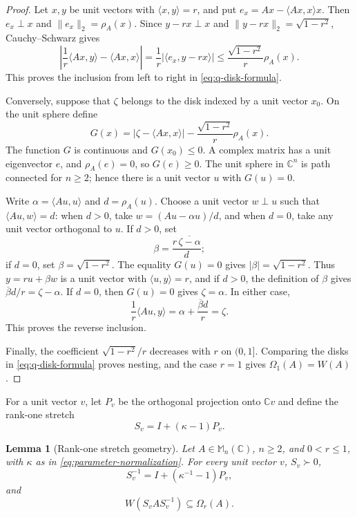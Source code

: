 \documentclass[preprints,article,submit,oneauthor]{Definitions/mdpi}
\newcounter{manuscriptresult}[section]
\theoremstyle{mdpi}
\newtheorem{lemma}[manuscriptresult]{Lemma}
\theoremstyle{definition}
\newcommand{\C}{\mathbb C}
\newcommand{\Mn}{\mathbb M_n(\C)}
\begin{document}
\begin{proof}
Let $x,y$ be unit vectors with $\langle x,y\rangle=r$, and put
$e_x=Ax-\langle Ax,x\rangle x$.  Then $e_x\perp x$ and
$\lVert e_x\rVert_2=\rho_A(x)$.  Since
$y-rx\perp x$ and $\lVert y-rx\rVert_2=\sqrt{1-r^2}$,
Cauchy--Schwarz gives
\[
 \left\lvert
  \frac1r\langle Ax,y\rangle-\langle Ax,x\rangle
 \right\rvert
 =\frac1r\lvert\langle e_x,y-rx\rangle\rvert
 \leq\frac{\sqrt{1-r^2}}r\rho_A(x).
\]
This proves the inclusion from left to right in
\eqref{eq:q-disk-formula}.

Conversely, suppose that $\zeta$ belongs to the disk indexed by a unit
vector $x_0$.  On the unit sphere define
\[
 G(x)=\lvert\zeta-\langle Ax,x\rangle\rvert
      -\frac{\sqrt{1-r^2}}r\rho_A(x).
\]
The function $G$ is continuous and $G(x_0)\leq0$.  A complex matrix has
a unit eigenvector $e$, and $\rho_A(e)=0$, so $G(e)\geq0$.  The unit
sphere in $\C^n$ is path connected for $n\geq2$; hence there is a unit
vector $u$ with $G(u)=0$.

Write $\alpha=\langle Au,u\rangle$ and $d=\rho_A(u)$.  Choose a unit
vector $w\perp u$ such that $\langle Au,w\rangle=d$: when $d>0$, take
$w=(Au-\alpha u)/d$, and when $d=0$, take any unit vector orthogonal to
$u$.  If $d>0$, set
\[
 \beta=\frac{r\,\overline{\zeta-\alpha}}d;
\]
if $d=0$, set $\beta=\sqrt{1-r^2}$.  The equality $G(u)=0$ gives
$\lvert\beta\rvert=\sqrt{1-r^2}$.  Thus
$y=ru+\beta w$ is a unit vector with $\langle u,y\rangle=r$, and
if $d>0$, the definition of $\beta$ gives
$\overline\beta d/r=\zeta-\alpha$.  If $d=0$, then $G(u)=0$ gives
$\zeta=\alpha$.  In either case,
\[
 \frac1r\langle Au,y\rangle
 =\alpha+\frac{\overline\beta d}{r}=\zeta.
\]
This proves the reverse inclusion.

Finally, the coefficient $\sqrt{1-r^2}/r$ decreases with $r$ on
$(0,1]$.  Comparing the disks in \eqref{eq:q-disk-formula} proves
nesting, and the case $r=1$ gives $\Omega_1(A)=W(A)$.
\end{proof}

For a unit vector $v$, let $P_v$ be the orthogonal projection onto
$\C v$ and define the rank-one stretch
\begin{equation}
 S_v=I+(\kappa-1)P_v.
 \label{eq:rank-one-stretch}
\end{equation}

\begin{lemma}[Rank-one stretch geometry]
\label{lem:rank-one-stretch}
Let $A\in\Mn$, $n\geq2$, and $0<r\leq1$, with $\kappa$ as in
\eqref{eq:parameter-normalization}.  For every unit vector $v$,
$S_v\succ0$,
\[
 S_v^{-1}=I+(\kappa^{-1}-1)P_v,
\]
and
\begin{equation}
 W(S_vAS_v^{-1})\subseteq\Omega_r(A).
 \label{eq:rank-one-stretch-containment}
\end{equation}
\end{lemma}
\end{document}
